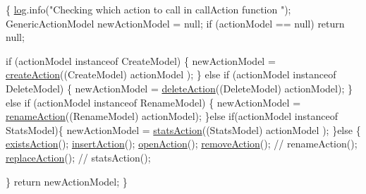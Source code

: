 \begin{DoxyCode}
                                                                               
       \{
        \hyperlink{classcom_1_1poly_1_1nlp_1_1filekommander_1_1file_1_1actions_1_1_call_action_a65b722d9482bd93c3ae2b31f51050a08}{log}.info(\textcolor{stringliteral}{"Checking which action to call in callAction function "});
        GenericActionModel newActionModel = null;
        \textcolor{keywordflow}{if} (actionModel == null)
            \textcolor{keywordflow}{return} null;

        \textcolor{keywordflow}{if} (actionModel instanceof CreateModel) \{
            newActionModel = \hyperlink{classcom_1_1poly_1_1nlp_1_1filekommander_1_1file_1_1actions_1_1_call_action_a9732d3e6e92378607607b7bd0bb91736}{createAction}((CreateModel) actionModel
      );
        \} \textcolor{keywordflow}{else} \textcolor{keywordflow}{if} (actionModel instanceof DeleteModel) \{
            newActionModel =    \hyperlink{classcom_1_1poly_1_1nlp_1_1filekommander_1_1file_1_1actions_1_1_call_action_ae2b04b022b8ec6d18419cc14d747972c}{deleteAction}((DeleteModel) 
      actionModel);
        \}  \textcolor{keywordflow}{else} \textcolor{keywordflow}{if} (actionModel instanceof RenameModel) \{
            newActionModel =    \hyperlink{classcom_1_1poly_1_1nlp_1_1filekommander_1_1file_1_1actions_1_1_call_action_a11aae4f7ed1d404e8cd63c48ce91f427}{renameAction}((RenameModel) 
      actionModel);
        \}\textcolor{keywordflow}{else} \textcolor{keywordflow}{if}(actionModel instanceof StatsModel)\{
            newActionModel =    \hyperlink{classcom_1_1poly_1_1nlp_1_1filekommander_1_1file_1_1actions_1_1_call_action_a2668fbc0bf50bdf3b09853f2d88d8a9d}{statsAction}((StatsModel) actionModel
      );
        \}\textcolor{keywordflow}{else} \{
            \hyperlink{classcom_1_1poly_1_1nlp_1_1filekommander_1_1file_1_1actions_1_1_call_action_aa13dda5197a227b0ccd0a742668ec861}{existsAction}();
            \hyperlink{classcom_1_1poly_1_1nlp_1_1filekommander_1_1file_1_1actions_1_1_call_action_ad1eda2fa13b7a6902c45e898cdee1e2f}{insertAction}();
            \hyperlink{classcom_1_1poly_1_1nlp_1_1filekommander_1_1file_1_1actions_1_1_call_action_a82b3550337442d231288438a479993b9}{openAction}();
            \hyperlink{classcom_1_1poly_1_1nlp_1_1filekommander_1_1file_1_1actions_1_1_call_action_a00509e9811e6faf029a136227ad9c4b6}{removeAction}();
        \textcolor{comment}{// renameAction();}
            \hyperlink{classcom_1_1poly_1_1nlp_1_1filekommander_1_1file_1_1actions_1_1_call_action_ac199f9c573025af0f871315ea997beaa}{replaceAction}();
        \textcolor{comment}{//  statsAction();}

        \}
        \textcolor{keywordflow}{return} newActionModel;
    \}
\end{DoxyCode}
